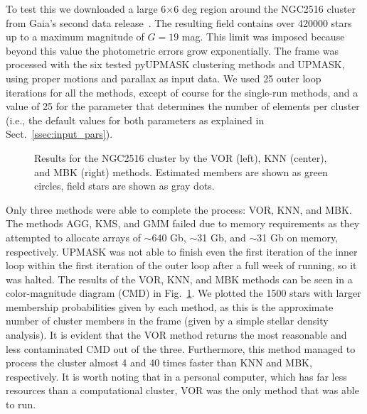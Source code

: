 \documentclass{aa}
\begin{document}
 To test this we downloaded a large 6$\times$6 deg region around the NGC2516
 cluster from Gaia's second data release~\citep{GaiaDR2_2018}. The resulting
 field contains over 420000 stars up to a maximum magnitude of $G=19$ mag. This
 limit was imposed because beyond this value the photometric errors grow
 exponentially.
 The frame was processed with the six tested pyUPMASK clustering methods
 and UPMASK, using proper motions and parallax as input data. We used 25
 outer loop iterations for all the methods, except of course for
 the single-run methods, and a value of 25 for the parameter that determines
 the number of elements per cluster (i.e., the default values for both
 parameters as explained in Sect.~\ref{ssec:input_pars}).\\

 \begin{figure}
 \caption{Results for the NGC2516 cluster by the VOR (left), KNN (center), and
 MBK (right) methods. Estimated members are shown as green circles, field stars
 are shown as gray dots.}
 \label{fig:NGC2516}
 \end{figure}

 Only three methods were able to complete the process: VOR, KNN, and MBK. The
 methods AGG, KMS, and GMM failed due to memory requirements as they
 attempted to allocate arrays of $\sim$640 Gb, $\sim$31 Gb, and
 $\sim$31 Gb on memory, respectively. UPMASK was not able to finish even the
 first iteration of the inner loop within the first iteration of the outer loop
 after a full week of running, so it was halted.
 The results of the VOR, KNN, and MBK methods can be seen in a color-magnitude
 diagram (CMD) in Fig.~\ref{fig:NGC2516}. We plotted the 1500 stars with larger
 membership probabilities given by each method, as this is the approximate
 number of cluster members in the frame (given by a simple stellar density
 analysis). It is evident that the VOR method returns the most reasonable and
 less contaminated CMD out of the three. Furthermore, this method managed to
 process the cluster almost 4 and 40 times faster than KNN and MBK,
 respectively. It is worth noting that in a personal computer, which has far
 less resources than a computational cluster, VOR was the only method that
 was able to run.\\
\end{document}
